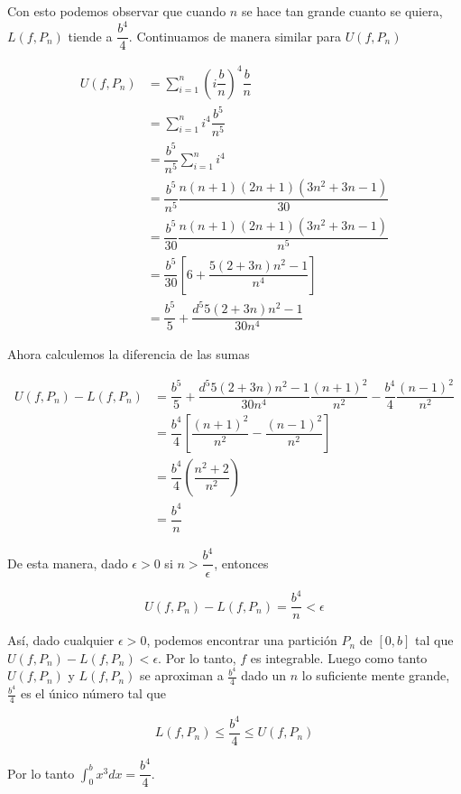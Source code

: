 \documentclass{report}
\begin{document}
\begin{enumerate}
        Con esto podemos observar que cuando $n$ se hace tan grande cuanto se quiera, $L(f, P_n)$ tiende a $\dfrac{b^4}{4}$. Continuamos de manera similar para $U(f, P_n)$

        \begin{align*}
            U(f, P_n) &= \sum_{i=1}^{n}\left(i\dfrac{b}{n}\right)^4\dfrac{b}{n}\\
            &= \sum_{i=1}^{n}i^4\dfrac{b^5}{n^5}\\
            &= \dfrac{b^5}{n^5} \sum_{i=1}^{n}i^4\\
            &= \dfrac{b^5}{n^5} \dfrac{n(n+1)(2n+1)(3n^2+3n-1)}{30}\\
            &= \dfrac{b^5}{30} \dfrac{n(n+1)(2n+1)(3n^2+3n-1)}{n^5}\\
            &= \dfrac{b^5}{30} \left[6 + \dfrac{5(2+3n)n^2-1}{n^4}\right]\\
            &= \dfrac{b^5}{5} + \dfrac{d^5 5(2+3n)n^2-1}{30n^4}
        \end{align*}

        Ahora calculemos la diferencia de las sumas

        \begin{align*}
            U(f, P_n) - L(f, P_n) &= \dfrac{b^5}{5} + \dfrac{d^5 5(2+3n)n^2-1}{30n^4} \dfrac{(n+1)^2}{n^2} - \dfrac{b^4}{4} \dfrac{(n-1)^2}{n^2}\\
            &= \dfrac{b^4}{4} \left[\dfrac{(n+1)^2}{n^2} - \dfrac{(n-1)^2}{n^2}\right]\\
            &= \dfrac{b^4}{4} \left(\dfrac{n^2+2}{n^2}\right)\\
            &= \dfrac{b^4}{n}
        \end{align*}

        De esta manera, dado $\epsilon > 0$ si $n > \dfrac{b^4}{\epsilon}$, entonces

        $$U(f, P_n) - L(f, P_n) = \dfrac{b^4}{n} < \epsilon$$

        Así, dado cualquier $\epsilon > 0$, podemos encontrar una partición $P_n$ de $[0,b]$ tal que $U(f, P_n) - L(f, P_n) < \epsilon$. Por lo tanto, $f$ es integrable. Luego como tanto $U(f, P_n)$ y $L(f, P_n)$ se aproximan a $\frac{b^4}{4}$ dado un $n$ lo suficiente mente grande, $\frac{b^4}{4}$ es el único número tal que

        $$L(f, P_n)  \leq \dfrac{b^4}{4} \leq U(f, P_n)$$

        Por lo tanto $\int_{0}^{b} x^3 dx = \dfrac{b^4}{4}$.
    \end{enumerate}
\end{document}
